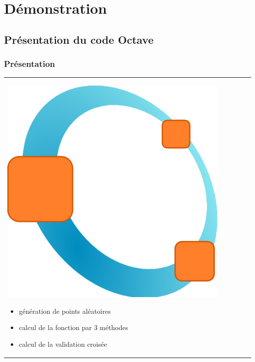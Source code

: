 \documentclass[handout]{beamer}
\begin{document}
	\section{Démonstration}

	\subsection{Présentation du code Octave}
		\begin{frame}
		\frametitle{Présentation}
		\begin{tabular}{l l}
			\begin{minipage}{0.4\textwidth}
				\begin{center}
					\includegraphics[width=0.9\textwidth]{images/octave.png}
				\end{center}
			\end{minipage}

			\begin{minipage}{0.6\textwidth}
				\begin{itemize}
					\item génération de points aléatoires 
					\item calcul de la fonction par 3 méthodes 
					\item calcul de la validation croisée
				\end{itemize}
			\end{minipage}

		\end{tabular}
		\end{frame}
\end{document}
